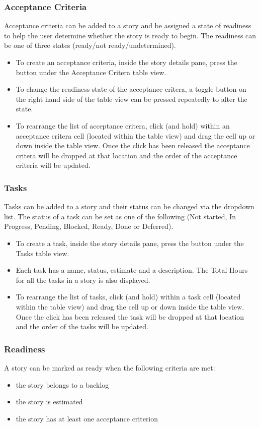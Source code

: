 \documentclass[11pt,fleqn]{book} %
\begin{document}
\subsubsection{Acceptance Criteria}
Acceptance criteria can be added to a story and be assigned a state of readiness to help the user determine whether the
story is ready to begin. The readiness can be one of three states (ready/not ready/undetermined).
\begin{itemize}
  \item To create an acceptance criteria, inside the story details pane, press the \menu{+} button under the Acceptance Critera table
  view.
  \item To change the readiness state of the acceptance critera, a toggle button on the right hand side of the table view
  can be pressed repeatedly to alter the state.
  \item To rearrange the list of acceptance critera, click (and hold) within an acceptance critera cell (located within the table view)
  and drag the cell up or down inside the table view. Once the click has been released the acceptance critera will be
  dropped at that location and the order of the acceptance criteria will be updated.
\end{itemize}

\subsubsection{Tasks}
Tasks can be added to a story and their status can be changed via the dropdown list.
The status of a task can be set as one of the following (Not started, In Progress, Pending, Blocked, Ready, Done or Deferred).
\begin{itemize}
   \item To create a task, inside the story details pane, press the \menu{+} button under the Tasks table view.
   \item Each task has a name, status, estimate and a description. The Total Hours for all the tasks in a story is also displayed.
   \item To rearrange the list of tasks, click (and hold) within a task cell (located within the table view)
   and drag the cell up or down inside the table view. Once the click has been released the task will be dropped at
   that location and the order of the tasks will be updated.
\end{itemize}

\subsubsection{Readiness}
A story can be marked as ready when the following criteria are met:
\begin{itemize}
\item the story belongs to a backlog
\item the story is estimated
\item the story has at least one acceptance criterion
\end{itemize}
\end{document}
